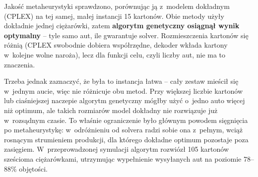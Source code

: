 \documentclass[12pt]{article}
\begin{document}
Jakość metaheurystyki sprawdzono, porównując ją z~modelem dokładnym (CPLEX) na tej samej, małej instancji 15 kartonów. Obie metody użyły dokładnie jednej ciężarówki, zatem \textbf{algorytm genetyczny osiągnął wynik optymalny} -- tyle samo aut, ile gwarantuje solver. Rozmieszczenia kartonów się różnią (CPLEX swobodnie dobiera współrzędne, dekoder wkłada kartony w~kolejne wolne naroża), lecz dla funkcji celu, czyli liczby aut, nie ma to znaczenia.

Trzeba jednak zaznaczyć, że była to instancja łatwa -- cały zestaw mieścił się w~jednym aucie, więc nie różnicuje obu metod. Przy większej liczbie kartonów lub ciaśniejszej naczepie algorytm genetyczny mógłby użyć o~jedno auto więcej niż optimum, ale takich rozmiarów model dokładny nie rozwiązuje już w~rozsądnym czasie. To właśnie ograniczenie było głównym powodem sięgnięcia po metaheurystykę: w~odróżnieniu od solvera radzi sobie ona z~pełnym, wciąż rosnącym strumieniem produkcji, dla którego dokładne optimum pozostaje poza zasięgiem. W~przeprowadzonej symulacji algorytm rozwiózł 105 kartonów sześcioma ciężarówkami, utrzymując wypełnienie wysyłanych aut na poziomie 78--88\% objętości.
\end{document}
